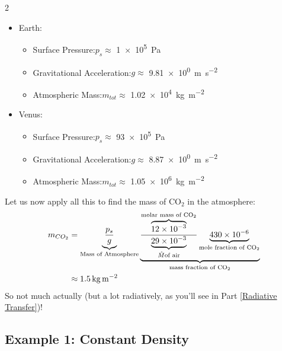 \begin{multicols}{2}
\begin{itemize}
    \item Earth: 
    \begin{itemize}
        \item Surface Pressure:\newline \(p_s\approx\) \qty{1e5}{\pascal}
        \item Gravitational Acceleration:\newline \(g\approx\) \qty{9.81e0}{\metre\per\second\squared}
        \item Atmospheric Mass:\newline \(m_{tot}\approx\) \qty{1.02e4}{\kilogram\per\metre\squared}
    \end{itemize}
    \item Venus: 
    \begin{itemize}
        \item Surface Pressure:\newline \(p_s\approx\) \qty{93e5}{\pascal}
        \item Gravitational Acceleration:\newline \(g\approx\) \qty{8.87e0}{\metre\per\second\squared}
        \item Atmospheric Mass:\newline \(m_{tot}\approx\) \qty{1.05e6}{\kilogram\per\metre\squared}
    \end{itemize}
\end{itemize}
\end{multicols}
\noindent Let us now apply all this to find the mass of CO\(_2\) in the atmosphere:
\begin{align*}
    m_{CO_2}&= \underbrace{\frac{p_s}{g}}_\text{Mass of Atmosphere} \underbrace{\frac{\overbrace{12\times10^{-3}}^{\text{molar mass of CO}_2}}{\underbrace{29\times10^{-3}}_{\hat{M} \text{of air}}} \underbrace{430 \times 10^{-6}}_{\text{mole fraction of CO}_2}}_{\text{mass fraction of CO}_2}\\
    &\approx\text{\qty{1.5}{\kilogram\per\meter\squared}}
\end{align*}
So not much actually (but a lot radiatively, as you'll see in Part \ref{Radiative Transfer})!
\subsection{Example 1: Constant Density}

